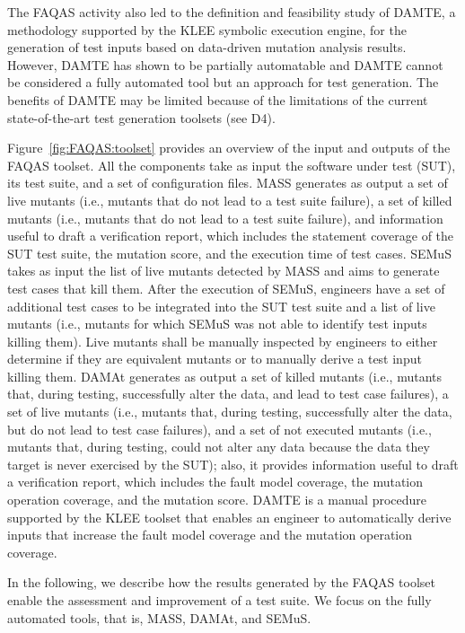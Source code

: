 The FAQAS activity also led to the definition and feasibility study of DAMTE, a methodology supported by the KLEE symbolic execution engine, for the generation of test inputs based on data-driven mutation analysis results. However, DAMTE has shown to be partially automatable and DAMTE cannot be considered a fully automated tool but an approach for test generation. The benefits of DAMTE may be limited because of the limitations of the current state-of-the-art test generation toolsets (see D4).

Figure~\ref{fig:FAQAS:toolset} provides an overview of the input and outputs of the FAQAS toolset. All the components take as input the software under test (SUT), its test suite, and a set of configuration files. 
MASS generates as output a set of live mutants (i.e., mutants that do not lead to a test suite failure), a set of killed mutants (i.e., mutants that do not lead to a test suite failure), and information useful to draft a verification report, which includes the statement coverage of the SUT test suite, the mutation score, and the execution time of test cases.
SEMuS takes as input the list of live mutants detected by MASS and aims to generate test cases that kill them. After the
 execution of SEMuS, engineers have a set of additional test cases to be integrated into the SUT test suite and a list of live mutants (i.e., mutants for which SEMuS was not able to identify test inputs killing them). Live mutants shall be manually inspected by engineers to either determine if they are equivalent mutants or to manually derive a test input killing them.
 DAMAt generates as output a set of killed mutants (i.e., mutants that, during testing, successfully alter the data, and lead to test case failures), a set of live mutants (i.e., mutants that, during testing, successfully alter the data, but do not lead to test case failures), and a set of not executed mutants (i.e., mutants that, during testing, could not alter any data because the data they target is never exercised by the SUT); also, it provides information useful to draft a verification report, which includes the fault model coverage, the mutation operation coverage, and the mutation score.
 DAMTE is a manual procedure supported by the KLEE toolset that enables an engineer to automatically derive inputs that increase the fault model coverage and the mutation operation coverage.

In the following, we describe how the results generated by the FAQAS toolset enable the assessment and improvement of a test suite.
We focus on the fully automated tools, that is, MASS, DAMAt, and SEMuS.


